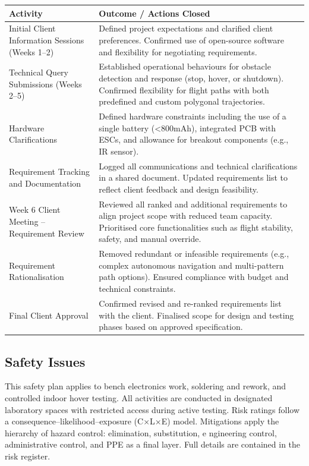 \begin{tabular}{|p{4cm}|p{10cm}|}
\hline
\rowcolor{gray!15}
\textbf{Activity} & \textbf{Outcome / Actions Closed} \\
\hline
Initial Client Information Sessions (Weeks 1–2) & Defined project expectations and clarified client preferences. Confirmed use of open-source software and flexibility for negotiating requirements. \\ \hline
Technical Query Submissions (Weeks 2–5) & Established operational behaviours for obstacle detection and response (stop, hover, or shutdown). Confirmed flexibility for flight paths with both predefined and custom polygonal trajectories. \\ \hline
Hardware Clarifications & Defined hardware constraints including the use of a single battery (<800mAh), integrated PCB with ESCs, and allowance for breakout components (e.g., IR sensor). \\ \hline
Requirement Tracking and Documentation & Logged all communications and technical clarifications in a shared document. Updated requirements list to reflect client feedback and design feasibility. \\ \hline
Week 6 Client Meeting – Requirement Review & Reviewed all ranked and additional requirements to align project scope with reduced team capacity. Prioritised core functionalities such as flight stability, safety, and manual override. \\ \hline
Requirement Rationalisation & Removed redundant or infeasible requirements (e.g., complex autonomous navigation and multi-pattern path options). Ensured compliance with budget and technical constraints. \\ \hline
Final Client Approval & Confirmed revised and re-ranked requirements list with the client. Finalised scope for design and testing phases based on approved specification. \\ \hline
\end{tabular}

\pagebreak
\subsection{Safety Issues}
This safety plan applies to bench electronics work, soldering and rework, and controlled indoor hover testing. All activities are conducted in designated laboratory spaces with restricted access during active testing. Risk ratings follow a consequence–likelihood–exposure (C×L×E) model. Mitigations apply the hierarchy of hazard control: elimination, substitution, e
ngineering control, administrative control, and PPE as a final layer. Full details are contained in the risk register.

